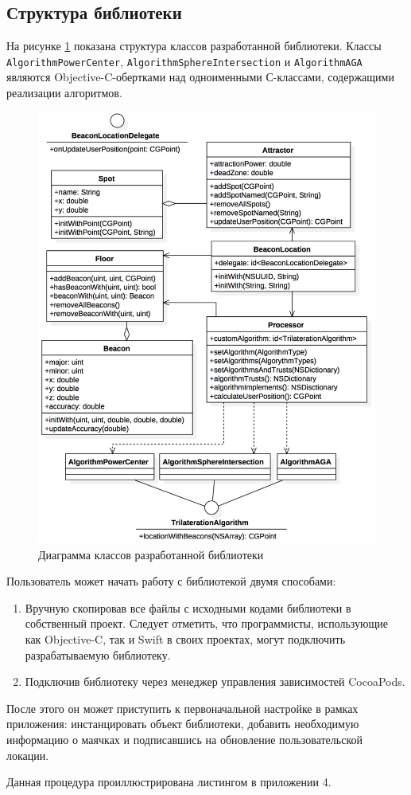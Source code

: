 \subsection{Структура библиотеки}

На рисунке \ref{fig:uml} показана структура классов разработанной библиотеки. Классы \texttt{AlgorithmPowerCenter}, \texttt{AlgorithmSphereIntersection} и \texttt{Algorithm\-AGA} являются Objective-C-обертками над одноименными С-классами, содержащими реализации алгоритмов.

\begin{figure}[h!]
    \centering
    \includegraphics[scale=0.7]{img/uml2}
    \caption{Диаграмма классов разработанной библиотеки}
    \label{fig:uml}
\end{figure}

Пользователь может начать работу с библиотекой двумя способами:
\begin{enumerate}
    \item
    Вручную скопировав все файлы с исходными кодами библиотеки в собственный проект. Следует отметить, что программисты, использующие как Objective-C, так и Swift в своих проектах, могут подключить разрабатываемую библиотеку.
    \item
    Подключив библиотеку через менеджер управления зависимостей Cocoa\-Pods.
\end{enumerate}

После этого он может приступить к первоначальной настройке в рамках приложения: инстанцировать объект библиотеки, добавить необходимую информацию о маячках и подписавшись на обновление пользовательской локации.

Данная процедура проиллюстрирована листингом в приложении 4.